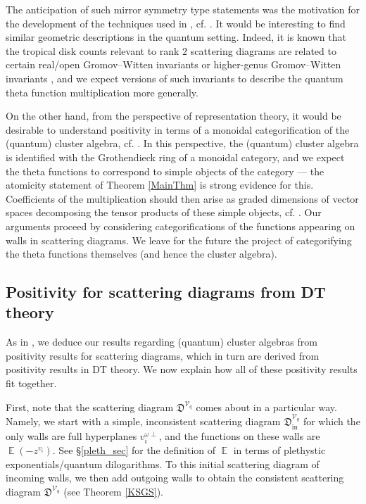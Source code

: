 \documentclass{amsart}
\DeclareMathOperator{\In}{in}
\DeclareMathOperator{\EE}{\mathbb{E}}
\let\f=\mathfrak
\let\s=\mathcal
\theoremstyle{plain}%
\theoremstyle{definition}
\theoremstyle{remark}
\begin{document}
The anticipation of such mirror symmetry type statements was the motivation for the development of the techniques used in \cite{GHKK}, cf. \cite{KS,GPS,GS11,CPS,WCS,GHK1,GHK3,GHS}.  It would be interesting to find similar geometric descriptions in the quantum setting.  Indeed, it is known that the tropical disk counts relevant to rank $2$ scattering diagrams are related to certain real/open Gromov--Witten invariants \cite{Mikq} or higher-genus Gromov--Witten invariants \cite{Bou,Bou2}, and we expect versions of such invariants to describe the quantum theta function multiplication more generally.

On the other hand, from the perspective of representation theory, it would be desirable to understand positivity in terms of a monoidal categorification of the (quantum) cluster algebra, cf. \cite{HernLec,Nak,KKKO}.  In this perspective, the (quantum) cluster algebra is identified with the Grothendieck ring of a monoidal category, and we expect the theta functions to correspond to simple objects of the category --- the atomicity statement of Theorem \ref{MainThm} is strong evidence for this.  Coefficients of the multiplication should then arise as graded dimensions of vector spaces decomposing the tensor products of these simple objects, cf. \cite[\S 1.5.4]{AlBPS}. Our arguments proceed by considering categorifications of the functions appearing on walls in scattering diagrams.  We leave for the future the project of categorifying the theta functions themselves (and hence the cluster algebra).

\subsection{Positivity for scattering diagrams from DT theory}
As in \cite{GHKK}, we deduce our results regarding (quantum) cluster algebras from positivity results for scattering diagrams, which in turn are derived from positivity results in DT theory.  We now explain how all of these positivity results fit together.

First, note that the scattering diagram $\f{D}^{\s{V}_{q}}$ comes about in a particular way.  Namely, we start with a simple, inconsistent scattering diagram $\f{D}_{\In}^{\s{V}_{q}}$ for which the only walls are full hyperplanes $v_i^{\omega\perp}$, and the functions on these walls are $\EE(-z^{v_i})$.  See \S \ref{pleth_sec} for the definition of $\EE$ in terms of plethystic exponentials/quantum dilogarithms.  To this initial scattering diagram of incoming walls, we then add outgoing walls  to obtain the consistent scattering diagram $\f{D}^{\s{V}_q}$ (see Theorem \ref{KSGS}).  
\end{document}
